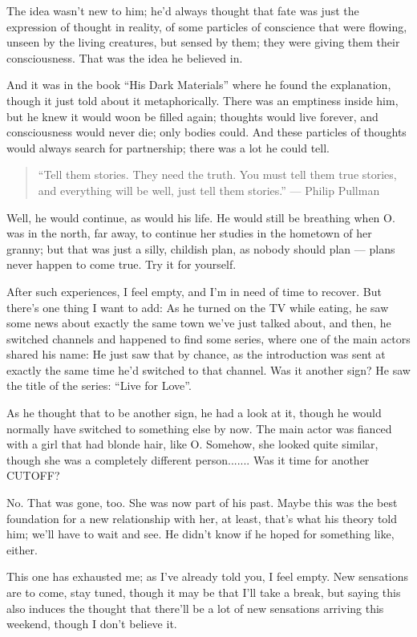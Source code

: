 The idea wasn't new to him; he'd always thought that fate was just the expression of thought in reality, of some particles of conscience that were flowing, unseen by the living creatures, but sensed by them; they were giving them their consciousness. 
That was the idea he believed in.

And it was in the book \enquote{His Dark Materials} where he found the explanation, though it just told about it metaphorically. 
There was an emptiness inside him, but he knew it would woon be filled again; thoughts would live forever, and consciousness would never die; only bodies could. 
And these particles of thoughts would always search for partnership; there was a lot he could tell. 
\begin{quote}
\enquote{Tell them stories. They need the truth. You must tell them true stories, and everything will 
be well, just tell them stories.}
--- Philip Pullman
\end{quote}
Well, he would continue, as would his life. 
He would still be breathing when O. was in the north, far away, to continue her studies in the hometown of her granny; but that was just a silly, childish plan, as nobody should plan --- plans never happen to come true. 
Try it for yourself.

After such experiences, I feel empty, and I'm in need of time to recover. 
But there's one thing I want to add: As he turned on the TV while eating, he saw some news about exactly the same town we've just talked about, and then, he switched channels and happened to find some series, where one of the main actors shared his name: He just saw that by chance, as the introduction was sent at exactly the same time he'd switched to that channel. 
Was it another sign?
He saw the title of the series: \enquote{Live for Love}.

As he thought that to be another sign, he had a look at it, though he would normally have switched to something else by now. 
The main actor was fianced with a girl that had blonde hair, like O. Somehow, she looked quite similar, though she was a completely different person.......
Was it time for another CUTOFF?

No. That was gone, too. She was now part of his past. Maybe this was the best foundation for a new relationship with her, at least, that's what his theory told him; we'll have to wait and see. 
He didn't know if he hoped for something like, either.

This one has exhausted me; as I've already told you, I feel empty. New sensations are to come, stay tuned, though it may be that I'll take a break, but saying this also induces the thought that there'll be a lot of new sensations arriving this weekend, though I don't believe it.

